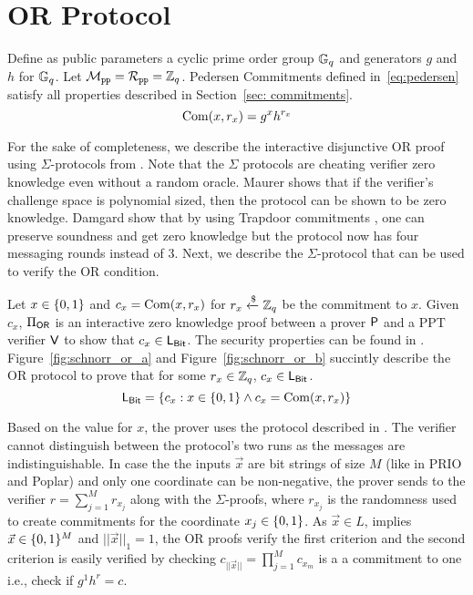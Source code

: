 \documentclass{article}
\begin{document}
% 
%


\section{OR Protocol}
\label{app:sigma_open}

Define as public parameters a cyclic prime order group $\mathbb{G}_q$ and generators $g$ and $h$ for $\mathbb{G}_q$. 
Let $\mathcal{M}_{\texttt{pp}} = \mathcal{R}_{\texttt{pp}} = \mathbb{Z}_q$. 
Pedersen Commitments defined in~\eqref{eq:pedersen} satisfy all properties described in Section~\ref{sec: commitments}.
%
\begin{equation}
    \operatorname{Com}(x, r_x) = g^xh^{r_x}
    \label{eq:pedersen}
\end{equation}

For the sake of completeness, we describe the interactive disjunctive OR proof using $\Sigma$-protocols from \cite{cramer1994proofs}. Note that the $\Sigma$ protocols are cheating verifier zero knowledge even without a random oracle. Maurer \cite{maurer2009unifying} shows that if the verifier's challenge space is polynomial sized, then the protocol can be shown to be zero knowledge. Damgard \etal show that by using Trapdoor commitments \cite{damgaard2000efficient}, one can preserve soundness and get zero knowledge but the protocol now has four messaging rounds instead of 3. Next, we describe the $\Sigma$-protocol that can be used to verify the OR condition. \par 
Let $x \in \{ 0, 1\}$ and $c_x = \operatorname{Com}(x, r_x)$ for $r_x \xleftarrow{\$} \mathbb{Z}_q$ be the commitment to $x$. 
Given $c_x$, $\Pi_{\mathsf{OR}}$ is an interactive zero knowledge proof between a prover $\mathsf{P}$ and a PPT verifier $\mathsf{V}$ to show that $c_x \in \mathsf{L}_{\mathsf{Bit}}$. 
The security properties can be found in \cite{thaler2020proofs, damgaard2000efficient, cramer1994proofs}.  Figure~\ref{fig:schnorr_or_a} and Figure~\ref{fig:schnorr_or_b}  succintly describe the OR protocol to prove that for some $r_x \in \mathbb{Z}_q$, $c_x \in \mathsf{L}_{\mathsf{Bit}}$. 
%
\begin{equation}
\mathsf{L}_{\mathsf{Bit}} = \{c_x: x \in \{ 0, 1\} \land c_x = \operatorname{Com}(x, r_x) \}    
\end{equation}

Based on the value for $x$, the prover uses the protocol described in . The verifier cannot distinguish between the protocol's two runs as the messages are indistinguishable. In case the the inputs $\vec{x}$ are bit strings of size $M$ (like in PRIO and Poplar) and only one coordinate can be non-negative, the prover sends to the verifier $r = \sum_{j=1}^M r_{x_j}$ along with the $\Sigma$-proofs, where $r_{x_j}$ is the randomness used to create commitments for the coordinate $x_j \in \{ 0, 1\}$. As $\vec{x} \in L$, implies $\vec{x} \in \{ 0, 1\}^M$ and $|| \vec{x}||_1 = 1$, the OR proofs verify the first criterion and the second criterion is easily verified by checking $c_{|| \vec{x}||} = \prod_{j=1}^M c_{x_m}$ is a a commitment to one i.e., check if $g^1h^r = c$. 
\end{document}
